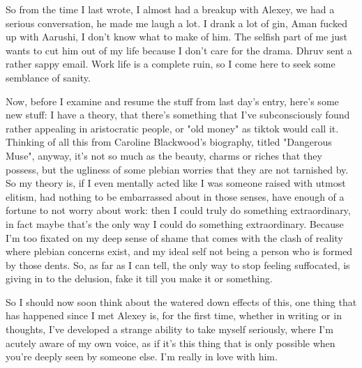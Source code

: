 \noindent {}

So from the time I last wrote, I almost had a breakup with Alexey, we had a serious conversation, he made me laugh a lot. I drank a lot of gin, Aman fucked up with Aarushi, I don't know what to make of him. The selfish part of me just wants to cut him out of my life because I don't care for the drama. Dhruv sent a rather sappy email. Work life is a complete ruin, so I come here to seek some semblance of sanity.

Now, before I examine and resume the stuff from last day's entry, here's some new stuff: I have a theory, that there's something that I've subconsciously found rather appealing in aristocratic people, or "old money" as tiktok would call it. Thinking of all this from Caroline Blackwood's biography, titled "Dangerous Muse", anyway, it's not so much as the beauty, charms or riches that they possess, but the ugliness of some plebian worries that they are not tarnished by. So my theory is, if I even mentally acted like I was someone raised with utmost elitism, had nothing to be embarrassed about in those senses, have enough of a fortune to not worry about work: then I could truly do something extraordinary, in fact maybe that's the only way I could do something extraordinary. Because I'm too fixated on my deep sense of shame that comes with the clash of reality where plebian concerns exist, and my ideal self not being a person who is formed by those dents. So, as far as I can tell, the only way to stop feeling suffocated, is giving in to the delusion, fake it till you make it or something. 

So I should now soon think about the watered down effects of this, one thing that has happened since I met Alexey is, for the first time, whether in writing or in thoughts, I've developed a strange ability to take myself seriously, where I'm acutely aware of my own voice, as if it's this thing that is only possible when you're deeply seen by someone else. I'm really in love with him. 

